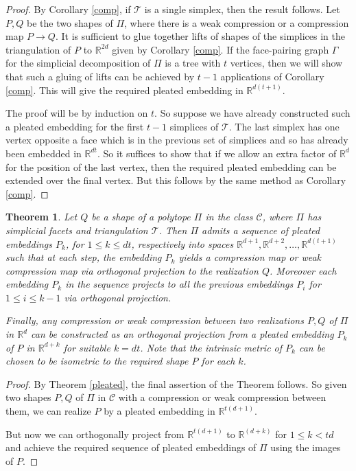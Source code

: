 \documentclass[a4paper, 12pt]{amsart}
\theoremstyle{plain}
\newtheorem{Thm}{Theorem}
\begin{document}
\begin{proof}
By Corollary \ref{comp}, if $\mathcal T$ is a single simplex, then the result follows. Let $P, Q$ be the two shapes of $\Pi$, where there is a weak compression or a compression map $P \to Q$. It is sufficient to glue together lifts of shapes of the simplices in the triangulation of $P$ to $\mathbb{R}^{2d}$ given by Corollary \ref{comp}. If the face-pairing graph $\Gamma$ for the simplicial decomposition of $\Pi$ is a tree with $t$ vertices, then we will show that such a gluing of lifts can be achieved by $t-1$ applications of Corollary \ref{comp}. This will give the required pleated embedding in $\mathbb{R}^{d(t+1)}$. 

The proof will be by induction on $t$. So suppose we have already constructed such a pleated embedding for the first $t-1$ simplices of $\mathcal T$. The last simplex has one vertex opposite a face which is in the previous set of simplices and so has already been embedded in $\mathbb{R}^{dt}$. So it suffices to show that if we allow an extra factor of $\mathbb{R}^{d}$ for the position of the last vertex, then the required pleated embedding can be extended over the final vertex. But this follows by the same method as Corollary \ref{comp}.
\end{proof}

\begin{Thm}\label{sequence}
Let $Q$ be a shape of a polytope $\Pi$ in the class $\mathcal{C}$, where $\Pi$ has simplicial facets and triangulation $\mathcal{T}$. Then $\Pi$ admits a sequence of pleated embeddings $P_{k}$, for $1 \le k \le dt$, respectively into spaces 
$
\mathbb{R}^{d+1}, \mathbb{R}^{d+2}, \dots, \mathbb{R}^{d(t+1)}
$
such that at each step, the embedding $P_{k}$ yields a compression map or weak compression map via orthogonal projection to the realization $Q$. Moreover each embedding $P_{k}$ in the sequence projects to all the previous embeddings $P_{i}$ for $1 \le i \le k-1$ via orthogonal projection. 

Finally, any compression or weak compression between two realizations $P,Q$ of $\Pi$ in $\mathbb{R}^d$ can be constructed as an orthogonal projection from a pleated  embedding $P_k$ of $P$ in $\mathbb{R}^{d+k}$ for suitable $k =dt$. Note that the intrinsic metric of $P_k$ can be chosen to be isometric to the required shape $P$ for each $k$. 
\end{Thm}

\begin{proof}

By Theorem \ref{pleated}, the final assertion of the Theorem follows. So given two shapes $P,Q$ of $\Pi$ in $\mathcal C$ with a compression or weak compression between them, we can realize $P$ by a pleated embedding in $\mathbb{R}^{t(d+1)}$.

But now we can orthogonally project from $\mathbb{R}^{t(d+1)}$ to $\mathbb{R}^{(d+k)}$ for $1 \le k<td$ and achieve the required sequence of pleated embeddings of $\Pi$ using the images of $P$.

\end{proof}
\end{document}
